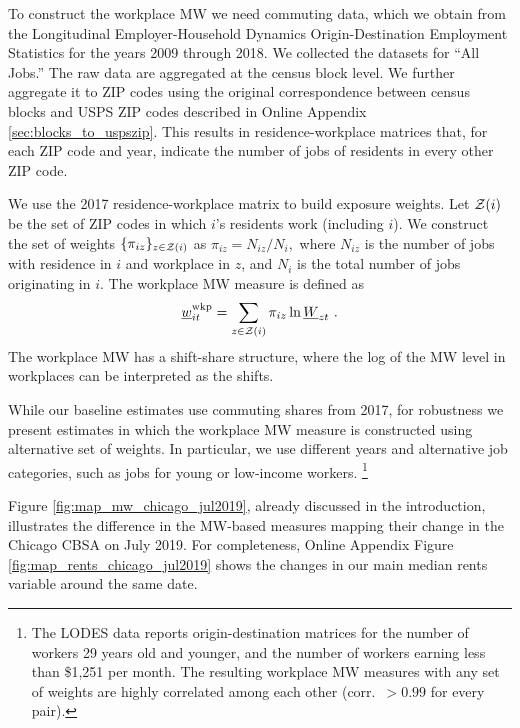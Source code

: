 To construct the workplace MW we need commuting data, which we obtain from the 
Longitudinal Employer-Household Dynamics Origin-Destination Employment Statistics 
\parencite[LODES;][]{CensusLODES} for the years 2009 through 2018.
We collected the datasets for ``All Jobs.''
The raw data are aggregated at the census block level. 
We further aggregate it to ZIP codes using the original correspondence between 
census blocks and USPS ZIP codes described in Online Appendix 
\ref{sec:blocks_to_uspszip}.
This results in residence-workplace matrices that, for each ZIP code and year, 
indicate the number of jobs of residents in every other ZIP code.

We use the 2017 residence-workplace matrix to build exposure weights.
Let $\mathcal{Z}(i)$ be the set of ZIP codes in which $i$'s residents work 
(including $i$).
We construct the set of weights $\{\pi_{iz}\}_{z\in\mathcal{Z}(i)}$ as 
$ \pi_{iz} = N_{iz}/{N_i} , $
where 
$N_{iz}$ is the number of jobs with residence in $i$ and workplace in $z$, 
and $N_i$ is the total number of jobs originating in $i$.
The workplace MW measure is defined as
\begin{equation*}\label{eq:mw_wkp_def}
    \mw^{\wkp}_{it} = \sum_{z\in\Z(i)} \pi_{iz} \ln \MW_{zt} \ .
\end{equation*}
The workplace MW has a shift-share structure, where the log of the MW level
in workplaces can be interpreted as the shifts.

While our baseline estimates use commuting shares from 2017,
for robustness we present estimates in which the workplace MW measure
is constructed using alternative set of weights.
In particular, we use different years and alternative job categories,
such as jobs for young or low-income workers.%
\footnote{The LODES data reports origin-destination matrices for the number of 
    workers 29 years old and younger, and the number of workers earning less 
    than \$1,251 per month.
The resulting workplace MW measures with any set of weights are highly correlated 
among each other (corr.\ $>0.99$ for every pair).}

Figure \ref{fig:map_mw_chicago_jul2019}, already discussed in the introduction,
illustrates the difference in the MW-based measures mapping their change in the 
Chicago CBSA on July 2019.
For completeness, Online Appendix Figure \ref{fig:map_rents_chicago_jul2019} 
shows the changes in our main median rents variable around the same date.


